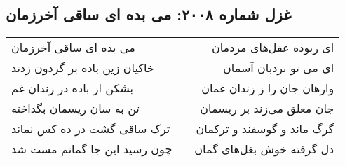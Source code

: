 \begin{center}
\section*{غزل شماره ۲۰۰۸: می بده ای ساقی آخرزمان}
\label{sec:2008}
\begin{longtable}{l p{0.5cm} r}
می بده ای ساقی آخرزمان
&&
ای ربوده عقل‌های مردمان
\\
خاکیان زین باده بر گردون زدند
&&
ای می تو نردبان آسمان
\\
بشکن از باده در زندان غم
&&
وارهان جان را ز زندان غمان
\\
تن به سان ریسمان بگداخته
&&
جان معلق می‌زند بر ریسمان
\\
ترک ساقی گشت در ده کس نماند
&&
گرگ ماند و گوسفند و ترکمان
\\
چون رسید این جا گمانم مست شد
&&
دل گرفته خوش بغل‌های گمان
\\
\end{longtable}
\end{center}
